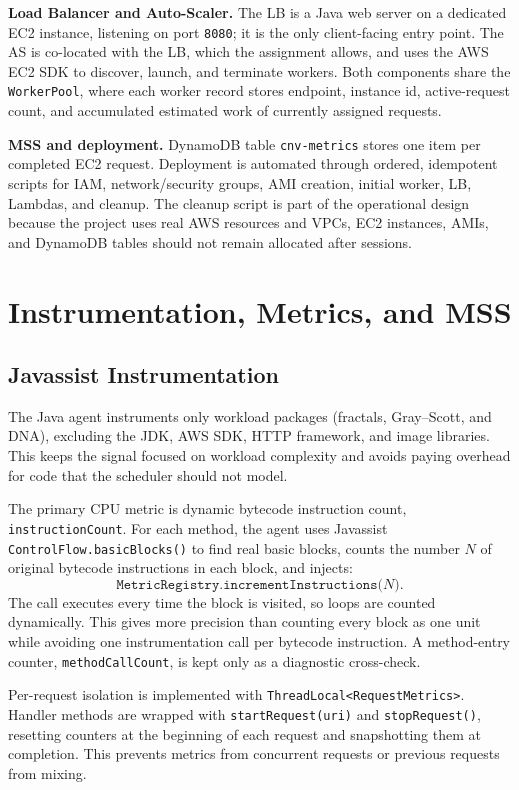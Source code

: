 \documentclass[10pt]{article}
\begin{document}
\textbf{Load Balancer and Auto-Scaler.} The LB is a Java web server on a dedicated EC2 instance, listening on port \texttt{8080}; it is the only client-facing entry point. The AS is co-located with the LB, which the assignment allows, and uses the AWS EC2 SDK to discover, launch, and terminate workers. Both components share the \texttt{WorkerPool}, where each worker record stores endpoint, instance id, active-request count, and accumulated estimated work of currently assigned requests.

\textbf{MSS and deployment.} DynamoDB table \texttt{cnv-metrics} stores one item per completed EC2 request. Deployment is automated through ordered, idempotent scripts for IAM, network/security groups, AMI creation, initial worker, LB, Lambdas, and cleanup. The cleanup script is part of the operational design because the project uses real AWS resources and VPCs, EC2 instances, AMIs, and DynamoDB tables should not remain allocated after sessions.

\section{Instrumentation, Metrics, and MSS}

\subsection{Javassist Instrumentation}

The Java agent instruments only workload packages (fractals, Gray--Scott, and DNA), excluding the JDK, AWS SDK, HTTP framework, and image libraries. This keeps the signal focused on workload complexity and avoids paying overhead for code that the scheduler should not model.

The primary CPU metric is dynamic bytecode instruction count, \texttt{instruction\allowbreak Count}. For each method, the agent uses Javassist \texttt{ControlFlow.basicBlocks()} to find real basic blocks, counts the number $N$ of original bytecode instructions in each block, and injects:
\[
\texttt{MetricRegistry.incrementInstructions(}N\texttt{)}.
\]
The call executes every time the block is visited, so loops are counted dynamically. This gives more precision than counting every block as one unit while avoiding one instrumentation call per bytecode instruction. A method-entry counter, \texttt{method\allowbreak Call\allowbreak Count}, is kept only as a diagnostic cross-check.

Per-request isolation is implemented with \texttt{ThreadLocal\allowbreak\textless Request\allowbreak Metrics\textgreater}. Handler methods are wrapped with \texttt{startRequest(uri)} and \texttt{stopRequest()}, resetting counters at the beginning of each request and snapshotting them at completion. This prevents metrics from concurrent requests or previous requests from mixing.
\end{document}
